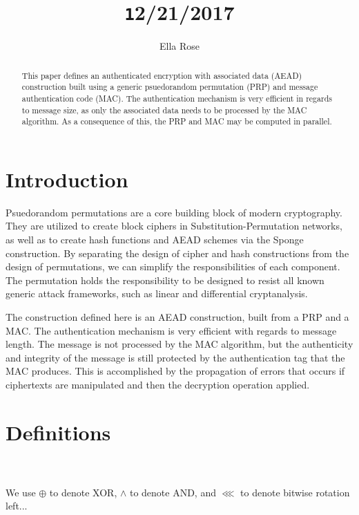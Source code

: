 \documentclass[preprint]{iacrtrans}
\author{Ella Rose\inst{1}}
\institute{Paso Robles, California \email{python_pride@protonmail.com}}
\title[\texttt 12/21/2017]{\texttt 12/21/2017}
\begin{document}
\maketitle


\begin{abstract}
  This paper defines an authenticated encryption with associated data (AEAD) construction built using a generic psuedorandom permutation (PRP) and message authentication code (MAC). The authentication mechanism is very efficient in regards to message size, as only the associated data needs to be processed by the MAC algorithm. As a consequence of this, the PRP and MAC may be computed in parallel.
\end{abstract}

\todototoc
\listoftodos

\section{Introduction}
 Psuedorandom permutations are a core building block of modern cryptography. They are utilized to create block ciphers in Substitution-Permutation networks, as well as to create hash functions and AEAD schemes via the Sponge construction. By separating the design of cipher and hash constructions from the design of permutations, we can simplify the responsibilities of each component. The permutation holds the responsibility to be designed to resist all known generic attack frameworks, such as linear and differential cryptanalysis. 

The construction defined here is an AEAD construction, built from a PRP and a MAC. The authentication mechanism is very efficient with regards to message length. The message is not processed by the MAC algorithm, but the authenticity and integrity of the message is still protected by the authentication tag that the MAC produces. This is accomplished by the propagation of errors that occurs if ciphertexts are manipulated and then the decryption operation applied.

\section{Definitions}
\\
\\
We use $\oplus$ to denote XOR, $\land$ to denote AND, and $\lll$ to denote bitwise rotation left...
\end{document}
